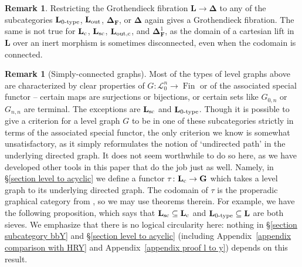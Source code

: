 \documentclass{amsart}
\numberwithin{theorem}{subsection}
\theoremstyle{definition}
\newtheorem{remark}[theorem]{Remark}
\newcommand{\finset}{\operatorname{Fin}}
\newcommand{\finsetskel}{\mathbf{F}}
\newcommand{\name}[1]{\ensuremath{\text{\textup{#1}}}}
\newcommand{\simp}{\mathbf{\Delta}}
\newcommand{\levelg}{\mathbf{L}}
\newcommand{\levelgconn}{\levelg_{\name{c}}}
\newcommand{\bbY}{\mathbf{G}}
\newcommand{\scriptyell}{\mathscr L}
\begin{document}
\begin{remark}
Restricting the Grothendieck fibration $\levelg \to \simp$ to any of the subcategories $\levelg_{\name{0-type}}$, $\levelg_{\name{out}}$, $\simp_\finsetskel$, or $\simp$ again gives a Grothendieck fibration.
The same is not true for $\levelgconn$, $\levelg_{\name{sc}}$, $\levelg_{\name{out,c}}$, and $\simp^1_\finsetskel$, as the domain of a cartesian lift in $\levelg$ over an inert morphism is sometimes disconnected, even when the codomain is connected.
\end{remark}

\begin{remark}[Simply-connected graphs]
Most of the types of level graphs above are characterized by clear properties of $G \colon \scriptyell^n_0 \to \finset$ or of the associated special functor -- certain maps are surjections or bijections, or certain sets like $G_{0,n}$ or $G_{n,n}$ are terminal.
The exceptions are $\levelg_{\name{sc}}$ and $\levelg_{\name{0-type}}$.
Though it is possible to give a criterion for a level graph $G$ to be in one of these subcategories strictly in terms of the associated special functor, the only criterion we know is somewhat unsatisfactory, as it simply reformulates the notion of `undirected path' in the underlying directed graph.
It does not seem worthwhile to do so here, as we have developed other tools in this paper that do the job just as well.
Namely, in \S\ref{section level to acyclic} we define a functor $\tau \colon \levelgconn \to \bbY$ which takes a level graph to its underlying directed graph.
The codomain of $\tau$ is the properadic graphical category from \cite{hrybook}, so we may use theorems therein.
For example, we have the following proposition, which says that $\levelg_{\name{sc}} \subseteq \levelgconn$ and $\levelg_{\name{0-type}} \subseteq \levelg$ are both sieves. 
We emphasize that there is no logical circularity here: nothing in \S\ref{section subcategory bbY} and \S\ref{section level to acyclic} (including Appendix~\ref{appendix comparison with HRY} and Appendix~\ref{appendix proof l to y}) depends on this result.
\end{remark}
\end{document}
